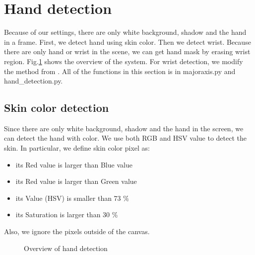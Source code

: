 \section{Hand detection}
Because of our settings, there are only white background, shadow and the hand in a frame.
First, we detect hand using skin color. Then we detect wrist. Because there are only hand or wrist in the scene, we can get hand mask by erasing wrist region. Fig.\ref{fig:hand} shows the overview of the system. For wrist detection, we modify the method from \cite{ra11}.
All of the functions in this section is in majoraxis.py and hand\_detection.py.

\subsection{Skin color detection}
Since there are only white background, shadow and the hand in the screen, we can detect the hand with color. We use both RGB and HSV value to detect the skin.
In particular, we define skin color pixel as:
\begin{itemize}
  \item its Red value is larger than Blue value
  \item its Red value is larger than Green value
  \item its Value (HSV) is smaller than 73 \%
  \item its Saturation is larger than 30 \%
 \end{itemize}
Also, we ignore the pixels outside of the canvas.
\begin{landscape}
\begin{figure}[htbp]
 \centering
 
 \caption{Overview of hand detection}
 \label{fig:hand}
\end{figure}
\end{landscape}



